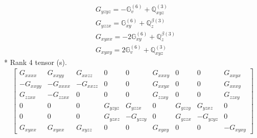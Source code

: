 \documentclass[fleqn,8pt,landscape]{jsarticle}
\begin{document}
\begin{align*}
& G_{yzyz} = - \mathbb{G}_{v}^{(6)} + \mathbb{Q}_{xyz}^{(3)} \\
& G_{yzzx} = \mathbb{G}_{xy}^{(6)} + \mathbb{Q}_{z}^{\beta(3)} \\
& G_{xyxx} = - 2 \mathbb{G}_{xy}^{(6)} + \mathbb{Q}_{z}^{\beta(3)} \\
& G_{xyxy} = 2 \mathbb{G}_{v}^{(6)} + \mathbb{Q}_{xyz}^{(3)}
\end{align*}
* Rank 4 tensor (s).
\begin{align*}
\begin{bmatrix} G_{xxxx} & G_{xxyy} & G_{xxzz} & 0 & 0 & G_{xxxy} & 0 & 0 & G_{xxyx} \\ - G_{xxyy} & - G_{xxxx} & - G_{xxzz} & 0 & 0 & G_{xxyx} & 0 & 0 & G_{xxxy} \\ G_{zzxx} & - G_{zzxx} & 0 & 0 & 0 & G_{zzxy} & 0 & 0 & G_{zzxy} \\ 0 & 0 & 0 & G_{yzyz} & G_{yzzx} & 0 & G_{yzzy} & G_{yzxz} & 0 \\ 0 & 0 & 0 & G_{yzxz} & - G_{yzzy} & 0 & G_{yzzx} & - G_{yzyz} & 0 \\ G_{xyxx} & G_{xyxx} & G_{xyzz} & 0 & 0 & G_{xyxy} & 0 & 0 & - G_{xyxy} \end{bmatrix}
\end{align*}
\end{document}
